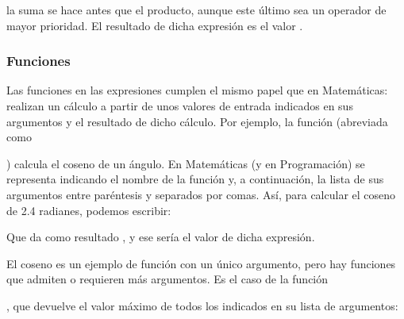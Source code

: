 \documentclass[a4paper,12pt,spanish]{sphinxmanual}
\begin{document}
\begin{sphinxVerbatim}[commandchars=\\\{\}]
    
\end{sphinxVerbatim}

la suma se hace antes que el producto, aunque este último sea un operador de
mayor prioridad. El resultado de dicha expresión es el valor .


\subsubsection{Funciones}
\label{\detokenize{php:funciones}}
\ignorespaces 
Las funciones en las expresiones cumplen el mismo papel que en Matemáticas:
realizan un cálculo a partir de unos valores de entrada indicados en sus
argumentos y  el resultado de dicho cálculo. Por ejemplo, la
función  (abreviada como %
\begin{footnote}[3]\sphinxAtStartFootnote
{}
%
\end{footnote}) calcula el coseno de un ángulo. En
Matemáticas (y en Programación) se representa indicando el nombre de la
función y, a continuación, la lista de sus argumentos entre paréntesis y
separados por comas. Así, para calcular el coseno de 2.4 radianes, podemos
escribir:

\begin{sphinxVerbatim}[commandchars=\\\{\}]
\end{sphinxVerbatim}

Que da como resultado , y ese sería el valor de dicha
expresión.

El coseno es un ejemplo de función con un único argumento, pero hay funciones
que admiten o requieren más argumentos. Es el caso de la función %
\begin{footnote}[4]\sphinxAtStartFootnote
{}
%
\end{footnote}, que
devuelve el valor máximo de todos los indicados en su lista de argumentos:
\end{document}
